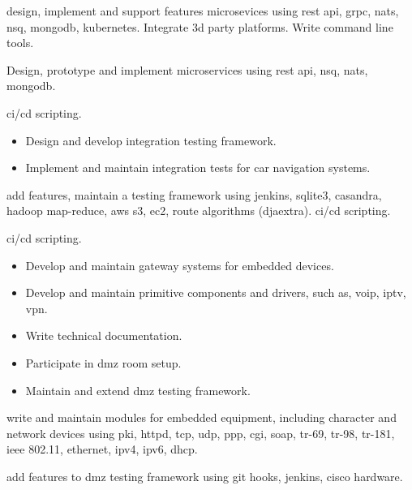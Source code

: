 \documentclass[10pt,a4paper,ragged2e,withhyper]{altacv}
\begin{document}

 design, implement and support features microsevices using rest
api, grpc, nats, nsq, mongodb, kubernetes. Integrate 3d party platforms. Write
command line tools.

 Design, prototype and implement microservices using rest api,
nsq, nats, mongodb.

 ci/cd scripting.

\divider

\begin{itemize}
\item Design and develop integration testing framework.
\item Implement and maintain integration tests for car navigation systems.
\end{itemize}


 add features, maintain a testing framework using jenkins,
sqlite3, casandra, hadoop map-reduce, aws s3, ec2, route algorithms (djaextra).
ci/cd scripting.

 ci/cd scripting.

\divider

\begin{itemize}
\item Develop and maintain gateway systems for embedded devices.
\item Develop and maintain primitive components and drivers, such as, voip, iptv, vpn.
\item Write technical documentation.
\item Participate in dmz room setup.
\item Maintain and extend dmz testing framework.
\end{itemize}


 write and maintain modules for embedded equipment, including character
and network devices using pki, httpd, tcp, udp, ppp, cgi, soap, tr-69, tr-98,
tr-181, ieee 802.11, ethernet, ipv4, ipv6, dhcp.

 add features to dmz testing framework using git hooks, jenkins,
cisco hardware.

\divider
\break
\break
\break
\break
\break
\break
\end{document}
